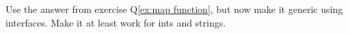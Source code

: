 \begin{Exercise}[title={Map function with interfaces},difficulty=2]
\label{ex:map function interfaces}
\Question
Use the answer from exercise Q\ref{ex:map function}, but now
make it generic using interfaces. Make it at least work for
ints and strings.
\end{Exercise}

\begin{Answer}
\Question

\end{Answer}


